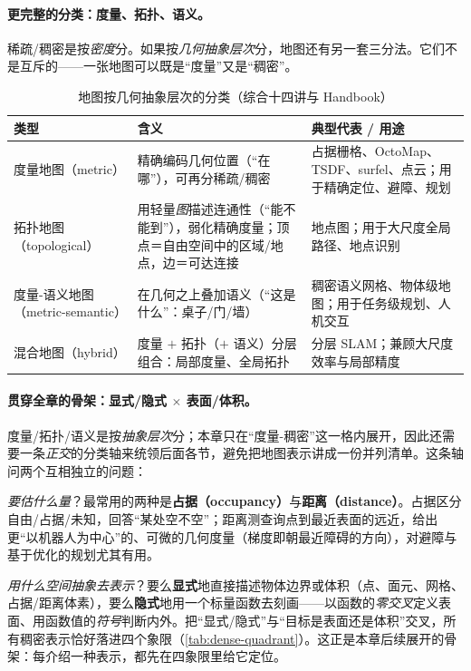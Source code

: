\paragraph{更完整的分类：度量、拓扑、语义。}
稀疏/稠密是按\emph{密度}分。如果按\emph{几何抽象层次}分，地图还有另一套三分法\cite{carlone2026handbook}。它们不是互斥的——一张地图可以既是“度量”又是“稠密”。

\begin{table}[H]\centering\small
\caption{地图按几何抽象层次的分类（综合十四讲\cite{gaoxiang2019slam14}与 Handbook\cite{carlone2026handbook}）}
\label{tab:dense-maptypes}
\begin{tabular}{p{} p{} p{}}
\toprule
类型 & 含义 & 典型代表 / 用途 \\
\midrule
度量地图（metric） & 精确编码几何位置（“在哪”），可再分稀疏/稠密 & 占据栅格、OctoMap、TSDF、surfel、点云；用于精确定位、避障、规划 \\
拓扑地图（topological） & 用轻量\emph{图}描述连通性（“能不能到”），弱化精确度量；顶点＝自由空间中的区域/地点，边＝可达连接 & 地点图；用于大尺度全局路径、地点识别 \\
度量-语义地图（metric-semantic） & 在几何之上叠加语义（“这是什么”：桌子/门/墙） & 稠密语义网格、物体级地图；用于任务级规划、人机交互 \\
混合地图（hybrid） & 度量 $+$ 拓扑（$+$ 语义）分层组合：局部度量、全局拓扑 & 分层 SLAM；兼顾大尺度效率与局部精度 \\
\bottomrule
\end{tabular}
\end{table}

\paragraph{贯穿全章的骨架：显式/隐式 $\times$ 表面/体积。}
度量/拓扑/语义是按\emph{抽象层次}分；本章只在“度量-稠密”这一格内展开，因此还需要一条\emph{正交}的分类轴来统领后面各节，避免把地图表示讲成一份并列清单。这条轴问两个互相独立的问题\cite{carlone2026handbook}：

\emph{要估什么量}？最常用的两种是\textbf{占据（occupancy）}与\textbf{距离（distance）}。占据区分自由/占据/未知，回答“某处空不空”；距离测查询点到最近表面的远近，给出更“以机器人为中心”的、可微的几何度量（梯度即朝最近障碍的方向），对避障与基于优化的规划尤其有用。

\emph{用什么空间抽象去表示}？要么\textbf{显式}地直接描述物体边界或体积（点、面元、网格、占据/距离体素），要么\textbf{隐式}地用一个标量函数去刻画——以函数的\emph{零交叉}定义表面、用函数值的\emph{符号}判断内外。把“显式/隐式”与“目标是表面还是体积”交叉，所有稠密表示恰好落进四个象限（\cref{tab:dense-quadrant}）。这正是本章后续展开的骨架：每介绍一种表示，都先在四象限里给它定位。

